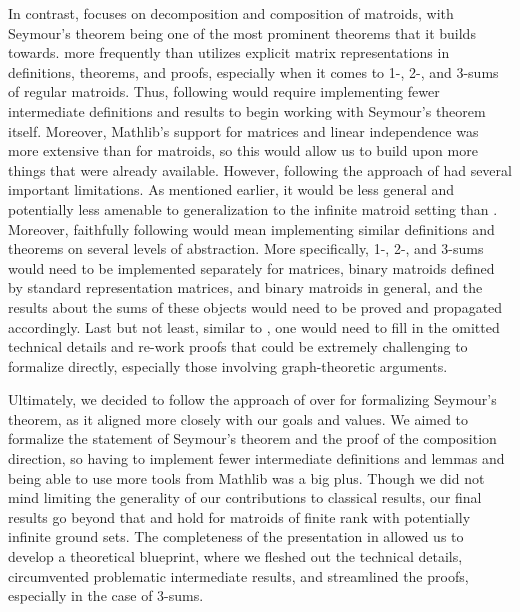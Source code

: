 In contrast, \cite{Truemper2016} focuses on decomposition and composition of matroids, with Seymour's theorem being one of the most prominent theorems that it builds towards. \citeauthor{Truemper2016} \cite{Truemper2016} more frequently than \citeauthor{Oxley2011} \cite{Oxley2011} utilizes explicit matrix representations in definitions, theorems, and proofs, especially when it comes to 1-, 2-, and 3-sums of regular matroids. Thus, following \cite{Truemper2016} would require implementing fewer intermediate definitions and results to begin working with Seymour's theorem itself. Moreover, Mathlib's support for matrices and linear independence was more extensive than for matroids, so this would allow us to build upon more things that were already available. However, following the approach of \cite{Truemper2016} had several important limitations. As mentioned earlier, it would be less general and potentially less amenable to generalization to the infinite matroid setting than \cite{Oxley2011}. Moreover, faithfully following \cite{Truemper2016} would mean implementing similar definitions and theorems on several levels of abstraction. More specifically, 1-, 2-, and 3-sums would need to be implemented separately for matrices, binary matroids defined by standard representation matrices, and binary matroids in general, and the results about the sums of these objects would need to be proved and propagated accordingly. Last but not least, similar to \cite{Oxley2011}, one would need to fill in the omitted technical details and re-work proofs that could be extremely challenging to formalize directly, especially those involving graph-theoretic arguments.

Ultimately, we decided to follow the approach of \cite{Truemper2016} over \cite{Oxley2011} for formalizing Seymour's theorem, as it aligned more closely with our goals and values. We aimed to formalize the statement of Seymour's theorem and the proof of the composition direction, so having to implement fewer intermediate definitions and lemmas and being able to use more tools from Mathlib was a big plus. Though we did not mind limiting the generality of our contributions to classical results, our final results go beyond that and hold for matroids of finite rank with potentially infinite ground sets. The completeness of the presentation in \cite{Truemper2016} allowed us to develop a theoretical blueprint, where we fleshed out the technical details, circumvented problematic intermediate results, and streamlined the proofs, especially in the case of 3-sums. %

